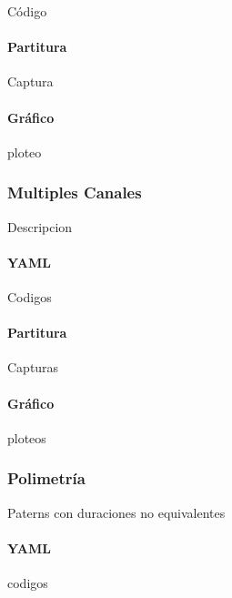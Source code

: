 \documentclass[]{article}
\let\oldparagraph\paragraph
\renewcommand{\paragraph}[1]{\oldparagraph{#1}\mbox{}}
\begin{document}
Código

\hypertarget{partitura}{%
\paragraph{Partitura}\label{partitura}}

Captura

\hypertarget{gruxe1fico}{%
\paragraph{Gráfico}\label{gruxe1fico}}

ploteo

\hypertarget{multiples-canales}{%
\subsubsection{Multiples Canales}\label{multiples-canales}}

Descripcion

\hypertarget{yaml-2}{%
\paragraph{YAML}\label{yaml-2}}

Codigos

\hypertarget{partitura-1}{%
\paragraph{Partitura}\label{partitura-1}}

Capturas

\hypertarget{gruxe1fico-1}{%
\paragraph{Gráfico}\label{gruxe1fico-1}}

ploteos

\hypertarget{polimetruxeda}{%
\subsubsection{Polimetría}\label{polimetruxeda}}

Paterns con duraciones no equivalentes

\hypertarget{yaml-3}{%
\paragraph{YAML}\label{yaml-3}}

codigos
\end{document}
